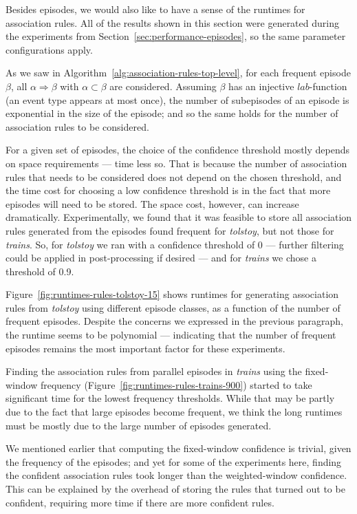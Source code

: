 Besides episodes, we would also like to have a sense of the runtimes for association rules. All of the results shown in this section were generated during the experiments from Section~\ref{sec:performance-episodes}, so the same parameter configurations apply.

As we saw in Algorithm~\ref{alg:association-rules-top-level}, for each frequent episode $ \beta $, all $ \alpha \Rightarrow \beta $ with $ \alpha \subset \beta $ are considered. Assuming $ \beta $ has an injective $ lab $-function (an event type appears at most once), the number of subepisodes of an episode is exponential in the size of the episode; and so the same holds for the number of association rules to be considered.

For a given set of episodes, the choice of the confidence threshold mostly depends on space requirements --- time less so. That is because the number of association rules that needs to be considered does not depend on the chosen threshold, and the time cost for choosing a low confidence threshold is in the fact that more episodes will need to be stored. The space cost, however, can increase dramatically. Experimentally, we found that it was feasible to store all association rules generated from the episodes found frequent for \emph{tolstoy}, but not those for \emph{trains}. So, for \emph{tolstoy} we ran with a confidence threshold of 0 --- further filtering could be applied in post-processing if desired --- and for \emph{trains} we chose a threshold of 0.9.

Figure~\ref{fig:runtimes-rules-tolstoy-15} shows runtimes for generating association rules from \emph{tolstoy} using different episode classes, as a function of the number of frequent episodes. Despite the concerns we expressed in the previous paragraph, the runtime seems to be polynomial --- indicating that the number of frequent episodes remains the most important factor for these experiments.

Finding the association rules from parallel episodes in \emph{trains} using the fixed-window frequency (Figure~\ref{fig:runtimes-rules-trains-900}) started to take significant time for the lowest frequency thresholds. While that may be partly due to the fact that large episodes become frequent, we think the long runtimes must be mostly due to the large number of episodes generated.

We mentioned earlier that computing the fixed-window confidence is trivial, given the frequency of the episodes; and yet for some of the experiments here, finding the confident association rules took longer than the weighted-window confidence. This can be explained by the overhead of storing the rules that turned out to be confident, requiring more time if there are more confident rules.

